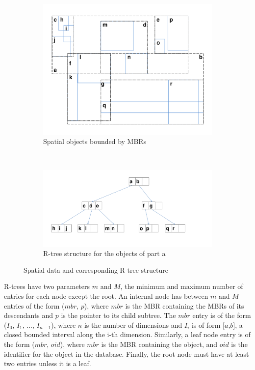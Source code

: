 \begin{figure}[t]
	\begin{subfigure}{0.48\textwidth}
		\includegraphics[width=\textwidth]{./figures/R_Tree_objects.pdf}
		\caption{Spatial objects bounded by MBRs}
		\label{fig:R-Tree_objects}
	\end{subfigure}
	~
	\begin{subfigure}{0.48\textwidth}
		\includegraphics[width=\textwidth]{./figures/R_Tree_structure.pdf}
		\caption{R-tree structure for the objects of part a}
		\label{fig:R-Tree_structure}
	\end{subfigure}
	\caption{Spatial data and corresponding R-tree structure}
\end{figure}


R-trees have two parameters $m$ and $M$, the minimum and maximum number
of entries for each node except the root. An internal node has between $m$ and $M$ entries
of the form ($mbr$, $p$), where $mbr$ is the MBR containing the MBRs of its 
descendants and $p$ is the pointer to its child subtree. The $mbr$ entry is of 
the form ($I_{0}$, $I_{1}$, ..., $I_{n-1}$), where $n$ is the number of 
dimensions and $I_{i}$ is of form $[a$,$b]$, a closed bounded interval along 
the i-th dimension. Similarly, a leaf node entry is of the form ($mbr$, $oid$), 
where $mbr$ is the MBR containing the object, and $oid$ is the identifier for the 
object in the database. Finally, the root node must have at least two entries
unless it is a leaf.

